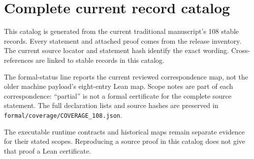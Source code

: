 \clearpage\appendix
\section{Complete current record catalog}\label{app:catalog}
This catalog is generated from the current traditional manuscript's 108 stable records. Every statement and attached proof comes from the release inventory. The current source locator and statement hash identify the exact wording. Cross-references are linked to stable records in this catalog.

The formal-status line reports the current reviewed correspondence map, not the older machine payload's eight-entry Lean map. Scope notes are part of each correspondence: ``partial'' is not a formal certificate for the complete source statement. The full declaration lists and source hashes are preserved in \nolinkurl{formal/coverage/COVERAGE_108.json}.

The executable runtime contracts and historical maps remain separate evidence for their stated scopes. Reproducing a source proof in this catalog does not give that proof a Lean certificate.
